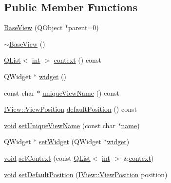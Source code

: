 \subsection*{Public Member Functions}
\begin{DoxyCompactItemize}
\item 
\hyperlink{group___core_plugin_ga5d80afbd92e0f0a0a53764a87f8f8c1b}{Base\-View} (Q\-Object $\ast$parent=0)
\item 
\hyperlink{group___core_plugin_ga0b87986502d132344f08be851cdb15d2}{$\sim$\-Base\-View} ()
\item 
\hyperlink{class_q_list}{Q\-List}$<$ \hyperlink{ioapi_8h_a787fa3cf048117ba7123753c1e74fcd6}{int} $>$ \hyperlink{group___core_plugin_ga237172a9f51bf4dd4a74c431d4cee707}{context} () const 
\item 
Q\-Widget $\ast$ \hyperlink{group___core_plugin_ga73210f3a32961fb3c1df6267292cc551}{widget} ()
\item 
const char $\ast$ \hyperlink{group___core_plugin_gab66e855b09d536c08790f53cdd26a853}{unique\-View\-Name} () const 
\item 
\hyperlink{group___core_plugin_ga2423997830c6fd1ceb278f80dcbfc010}{I\-View\-::\-View\-Position} \hyperlink{group___core_plugin_gaaf97d82844aaac02f2116f78c9ec7898}{default\-Position} () const 
\item 
\hyperlink{group___u_a_v_objects_plugin_ga444cf2ff3f0ecbe028adce838d373f5c}{void} \hyperlink{group___core_plugin_gad9c37de2ece6e6152bdb4ceadf0e9618}{set\-Unique\-View\-Name} (const char $\ast$\hyperlink{glext_8h_ad977737dfc9a274a62741b9500c49a32}{name})
\item 
Q\-Widget $\ast$ \hyperlink{group___core_plugin_ga010e75c3fb8e47962937ebeec0d133f7}{set\-Widget} (Q\-Widget $\ast$\hyperlink{group___core_plugin_ga73210f3a32961fb3c1df6267292cc551}{widget})
\item 
\hyperlink{group___u_a_v_objects_plugin_ga444cf2ff3f0ecbe028adce838d373f5c}{void} \hyperlink{group___core_plugin_ga0d50cefedb506910309b1e83938ae3a3}{set\-Context} (const \hyperlink{class_q_list}{Q\-List}$<$ \hyperlink{ioapi_8h_a787fa3cf048117ba7123753c1e74fcd6}{int} $>$ \&\hyperlink{group___core_plugin_ga237172a9f51bf4dd4a74c431d4cee707}{context})
\item 
\hyperlink{group___u_a_v_objects_plugin_ga444cf2ff3f0ecbe028adce838d373f5c}{void} \hyperlink{group___core_plugin_ga4cd8b9c4d6cf47fa0ece91c8783a3c17}{set\-Default\-Position} (\hyperlink{group___core_plugin_ga2423997830c6fd1ceb278f80dcbfc010}{I\-View\-::\-View\-Position} position)
\end{DoxyCompactItemize}
